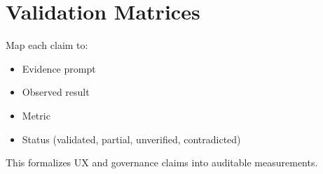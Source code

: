 \section*{Validation Matrices}

Map each claim to:
\begin{itemize}
  \item Evidence prompt
  \item Observed result
  \item Metric
  \item Status (validated, partial, unverified, contradicted)
\end{itemize}

This formalizes UX and governance claims into auditable measurements.
